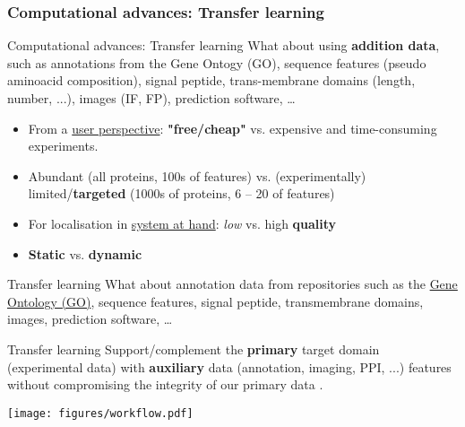 \subsubsection{Computational advances: Transfer learning}

\begin{frame}{Computational advances: Transfer learning}
  What about using \textbf{addition data}, such as annotations from
  the Gene Ontogy (GO), sequence features (pseudo aminoacid
  composition), signal peptide, trans-membrane domains (length, number,
  ...), images (IF, FP), prediction software, \ldots

  \begin{block}{}
    \begin{itemize}
    \item From a \underline{user perspective}: \textbf{"free/cheap"}
      vs. expensive and time-consuming experiments.
    \item Abundant (all proteins, 100s of features) vs. (experimentally)
      limited/\textbf{targeted} (1000s of proteins, 6 -- 20 of features)
    \item For localisation in \underline{system at hand}: \textit{low}
      vs. high \textbf{quality}
    \item \textbf{Static} vs. \textbf{dynamic}
    \end{itemize}
  \end{block}

\end{frame}

\begin{frame}{Transfer learning}
  What about annotation data from repositories such as the
  \underline{Gene Ontology (GO)}, sequence features, signal peptide,
  transmembrane domains, images, prediction software, \ldots

  \begin{block}{Transfer learning}
    Support/complement the \textbf{primary} target domain
    (experimental data) with \textbf{auxiliary} data (annotation,
    imaging, PPI, ...)  features without compromising the integrity of
    our primary data \citep{Breckels:2016}.
  \end{block}

\end{frame}


\begin{frame}
  \begin{center}
    \texttt{[image: figures/workflow.pdf]}      
  \end{center}
\end{frame}

